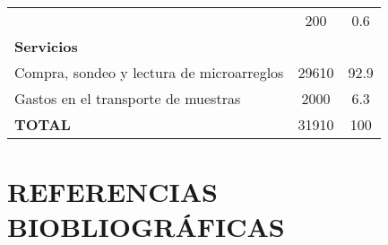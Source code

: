 \documentclass[a4paper]{article}
\begin{document}
\begin{longtable}[]{@{}lcc@{}}
\begin{minipage}[t]{0.44\columnwidth}
\end{minipage} & \begin{minipage}[t]{0.23\columnwidth}\centering\strut
200\strut
\end{minipage} & \begin{minipage}[t]{0.23\columnwidth}\centering\strut
0.6\strut
\end{minipage}\tabularnewline
\begin{minipage}[t]{0.44\columnwidth}\raggedright\strut
\textbf{Servicios}\strut
\end{minipage} & \begin{minipage}[t]{0.23\columnwidth}\centering\strut
\strut
\end{minipage} & \begin{minipage}[t]{0.23\columnwidth}\centering\strut
\strut
\end{minipage}\tabularnewline
\begin{minipage}[t]{0.44\columnwidth}\raggedright\strut
Compra, sondeo y lectura de microarreglos\strut
\end{minipage} & \begin{minipage}[t]{0.23\columnwidth}\centering\strut
29610\strut
\end{minipage} & \begin{minipage}[t]{0.23\columnwidth}\centering\strut
92.9\strut
\end{minipage}\tabularnewline
\begin{minipage}[t]{0.44\columnwidth}\raggedright\strut
Gastos en el transporte de muestras\strut
\end{minipage} & \begin{minipage}[t]{0.23\columnwidth}\centering\strut
2000\strut
\end{minipage} & \begin{minipage}[t]{0.23\columnwidth}\centering\strut
6.3\strut
\end{minipage}\tabularnewline
\begin{minipage}[t]{0.44\columnwidth}\raggedright\strut
\textbf{TOTAL}\strut
\end{minipage} & \begin{minipage}[t]{0.23\columnwidth}\centering\strut
31910\strut
\end{minipage} & \begin{minipage}[t]{0.23\columnwidth}\centering\strut
100\strut
\end{minipage}\tabularnewline
\bottomrule
\end{longtable}

\section{REFERENCIAS BIOBLIOGRÁFICAS}\label{referencias-biobliograficas}
\end{document}

